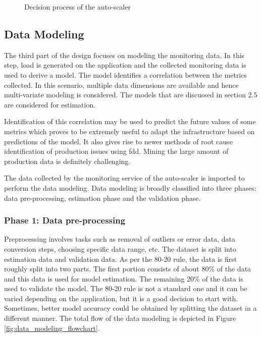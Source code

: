 \documentclass[article,type=msc,colorback,12pt,accentcolor=tud8b,table]{tudthesis}
\begin{document}
	  	 	 \begin{figure}[!h]
	  	 	 	\begin{center}
	  	 	 	\end{center}
	  	 	 	\caption{Decision process of the auto-scaler}
	  	 	 	\label{fig:autoscaler}
	  	 	 \end{figure}

 	\subsection{Data Modeling}
 	
 	The third part of the design focuses on modeling the monitoring data. In this step, load is generated on the application and the collected monitoring data is used to derive a model. The model identifies a correlation between the metrics collected. In this scenario, multiple data dimensions are available and hence multi-variate modeling is considered. The models that are discussed in section 2.5 are considered for estimation. 
 	
	 Identification of this correlation may be used to predict the future values of some metrics which proves to be extremely useful to adapt the infrastructure based on predictions of the model. It also gives rise to newer methods of root cause identification of production issues using \gls{fdd}. Mining the large amount of production data is definitely challenging.
 	
 	The data collected by the monitoring service of the auto-scaler is imported to perform the data modeling. Data modeling is broadly classified into three phases: data pre-processing, estimation phase and the validation phase. 
 	
 	 \subsubsection{Phase 1: Data pre-processing}
 	
 	Preprocessing involves tasks such as removal of outliers or error data, data conversion steps, choosing specific data range, etc. The dataset is split into estimation data and validation data. As per the 80-20 rule, the data is first roughly split into two parts. The first portion consists of about 80\% of the data and this data is used for model estimation. The remaining 20\% of the data is used to validate the model. The 80-20 rule is not a standard one and it can be varied depending on the application, but it is a good decision to start with. Sometimes, better model accuracy could be obtained by splitting the dataset in a different manner. The total flow of the data modeling is depicted in Figure \ref{fig:data_modeling_flowchart}.
 	
\end{document}
